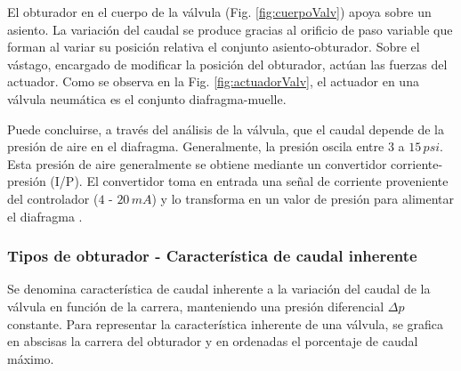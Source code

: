 El obturador en el cuerpo de la válvula (Fig. \ref{fig:cuerpoValv}) apoya
sobre un asiento.
La variación del caudal se produce gracias al orificio de paso variable
que forman al variar su posición relativa el conjunto asiento-obturador.
Sobre el vástago, encargado de modificar la posición del obturador,
actúan las fuerzas del actuador.
Como se observa en la Fig. \ref{fig:actuadorValv}, el actuador en una válvula
neumática es el conjunto diafragma-muelle.

Puede concluirse, a través del análisis de la válvula, que el caudal depende de
la presión de aire en el diafragma.
Generalmente, la presión oscila entre $3$ a $15\,psi$.
Esta presión de aire generalmente se obtiene mediante un convertidor
corriente-presión (I/P).
El convertidor toma en entrada una señal de corriente proveniente del
controlador
($4$ - $20\,mA$) y lo transforma en un valor de presión para alimentar el
diafragma \cite{bib:ApuntesPuglesiValvulas}.


\subsubsection{Tipos de obturador - Característica de caudal inherente}
Se denomina característica de caudal inherente a la variación del caudal de
la válvula en función de la carrera, manteniendo una presión diferencial
$\Delta p$ constante.
Para representar la característica inherente de una válvula, se grafica en
abscisas la carrera del obturador y en ordenadas el porcentaje de caudal máximo.

